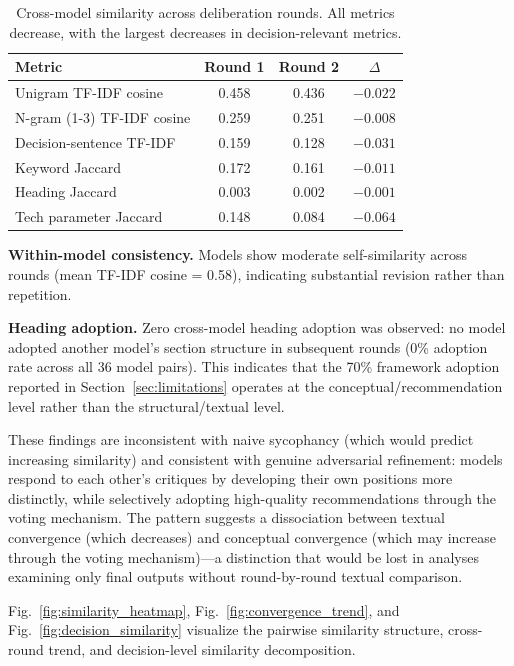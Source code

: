 \documentclass[11pt,a4paper]{article}
\begin{document}
\begin{table}[t]
\centering
\caption{Cross-model similarity across deliberation rounds. All metrics decrease, with the largest decreases in decision-relevant metrics.}
\label{tab:similarity}
\begin{tabular}{lccc}
\toprule
Metric & Round 1 & Round 2 & $\Delta$ \\
\midrule
Unigram TF-IDF cosine & 0.458 & 0.436 & $-0.022$ \\
N-gram (1-3) TF-IDF cosine & 0.259 & 0.251 & $-0.008$ \\
Decision-sentence TF-IDF & 0.159 & 0.128 & $-0.031$ \\
Keyword Jaccard & 0.172 & 0.161 & $-0.011$ \\
Heading Jaccard & 0.003 & 0.002 & $-0.001$ \\
Tech parameter Jaccard & 0.148 & 0.084 & $-0.064$ \\
\bottomrule
\end{tabular}
\end{table}

\textbf{Within-model consistency.} Models show moderate self-similarity across rounds (mean TF-IDF cosine = 0.58), indicating substantial revision rather than repetition.

\textbf{Heading adoption.} Zero cross-model heading adoption was observed: no model adopted another model's section structure in subsequent rounds (0\% adoption rate across all 36 model pairs). This indicates that the 70\% framework adoption reported in Section~\ref{sec:limitations} operates at the conceptual/recommendation level rather than the structural/textual level.

These findings are inconsistent with naive sycophancy (which would predict increasing similarity) and consistent with genuine adversarial refinement: models respond to each other's critiques by developing their own positions more distinctly, while selectively adopting high-quality recommendations through the voting mechanism. The pattern suggests a dissociation between textual convergence (which decreases) and conceptual convergence (which may increase through the voting mechanism)---a distinction that would be lost in analyses examining only final outputs without round-by-round textual comparison.

Fig.~\ref{fig:similarity_heatmap}, Fig.~\ref{fig:convergence_trend}, and Fig.~\ref{fig:decision_similarity} visualize the pairwise similarity structure, cross-round trend, and decision-level similarity decomposition.
\end{document}
